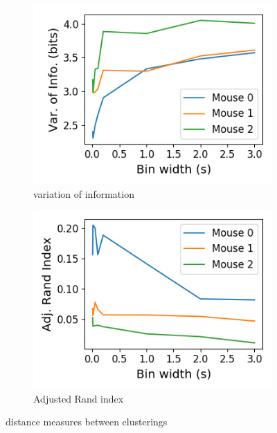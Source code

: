\documentclass[a4paper,12pt]{article}
\theoremstyle{definition}
\begin{document}
  \begin{figure}[h]
    \begin{subfigure}[h]{0.5\linewidth}
      \includegraphics[width=\linewidth]{figures/variation_of_information_rectified_total.png}
      \caption{variation of information}
      \label{fig:variation_of_information_rectified_total}
    \end{subfigure}
    \begin{subfigure}[h]{0.5\linewidth}
      \includegraphics[width=\linewidth]{figures/adjusted_rand_index_rectified_total.png}
      \caption{Adjusted Rand index}
      \label{fig:adjusted_rand_index_rectified_total}
    \end{subfigure}
    \caption{distance measures between clusterings}
    \label{fig:distance_measures}
  \end{figure}
\end{document}
